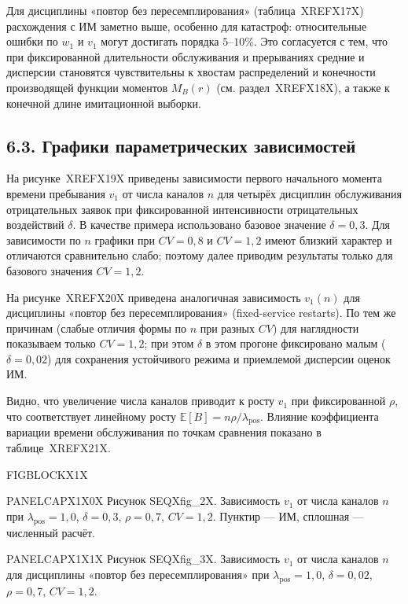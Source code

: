 Для дисциплины «повтор без пересемплирования» (таблица~XREFX17X) расхождения с ИМ заметно выше, особенно для катастроф: относительные ошибки по \(w_1\) и \(v_1\) могут достигать порядка \(5\text{--}10\%\). Это согласуется с тем, что при фиксированной длительности обслуживания и прерываниях средние и дисперсии становятся чувствительны к хвостам распределений и конечности производящей функции моментов \(M_B(r)\) (см. раздел~XREFX18X), а также к конечной длине имитационной выборки.

\subsection*{6.3. Графики параметрических зависимостей}


На рисунке~XREFX19X приведены зависимости первого начального момента времени пребывания \(v_1\) от числа каналов \(n\) для четырёх дисциплин обслуживания отрицательных заявок при фиксированной интенсивности отрицательных воздействий \(\delta\). В качестве примера использовано базовое значение \(\delta=0{,}3\). Для зависимости по \(n\) графики при \(CV=0{,}8\) и \(CV=1{,}2\) имеют близкий характер и отличаются сравнительно слабо; поэтому далее приводим результаты только для базового значения \(CV=1{,}2\).

На рисунке~XREFX20X приведена аналогичная зависимость \(v_1(n)\) для дисциплины «повтор без пересемплирования» (fixed-service restarts). По тем же причинам (слабые отличия формы по \(n\) при разных \(CV\)) для наглядности показываем только \(CV=1{,}2\); при этом \(\delta\) в этом прогоне фиксировано малым (\(\delta=0{,}02\)) для сохранения устойчивого режима и приемлемой дисперсии оценок ИМ.

Видно, что увеличение числа каналов приводит к росту \(v_1\) при фиксированной \(\rho\), что соответствует линейному росту \(\mathbb{E}[B]=n\rho/\lambda_{\mathrm{pos}}\). Влияние коэффициента вариации времени обслуживания по точкам сравнения показано в таблице~XREFX21X.

\noindent FIGBLOCKX1X\par

\noindent PANELCAPX1X0X Рисунок SEQXfig_2X. Зависимость \(v_1\) от числа каналов \(n\) при \(\lambda_{\text{pos}}=1{,}0\), \(\delta=0{,}3\), \(\rho=0{,}7\), \(CV=1{,}2\). Пунктир --- ИМ, сплошная --- численный расчёт.\par

\noindent PANELCAPX1X1X Рисунок SEQXfig_3X. Зависимость \(v_1\) от числа каналов \(n\) для дисциплины «повтор без пересемплирования» при \(\lambda_{\text{pos}}=1{,}0\), \(\delta=0{,}02\), \(\rho=0{,}7\), \(CV=1{,}2\).\par

